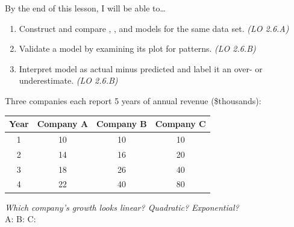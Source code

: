 \documentclass[10pt]{article}
\begin{document}
\namedateperiod

\vspace{0.06in}

\begin{objectivebox}
By the end of this lesson, I will be able to\ldots
\begin{enumerate}[itemsep=2pt]
  \item Construct and compare , , and  models for
        the same data set. \hfill\textit{(LO 2.6.A)}
  \item Validate a model by examining its  plot for patterns. \hfill\textit{(LO 2.6.B)}
  \item Interpret model  as actual minus predicted and label it an over- or
        underestimate. \hfill\textit{(LO 2.6.B)}
\end{enumerate}
\end{objectivebox}

\vspace{0.05in}

\begin{vocabbox}
\end{vocabbox}

\vspace{0.05in}

\begin{hookbox}
Three companies each report 5 years of annual revenue (\$thousands):

\medskip
\begin{center}
\renewcommand{\arraystretch}{1.4}
\begin{tabular}{c|c|c|c}
\textbf{Year} & \textbf{Company A} & \textbf{Company B} & \textbf{Company C} \\ \hline
1 & 10 & 10 & 10 \\
2 & 14 & 16 & 20 \\
3 & 18 & 26 & 40 \\
4 & 22 & 40 & 80 \\
\end{tabular}
\end{center}

\medskip
\textit{Which company's growth looks linear? Quadratic? Exponential?} \\
A:  \quad B:  \quad C: 
\end{hookbox}
\end{document}
